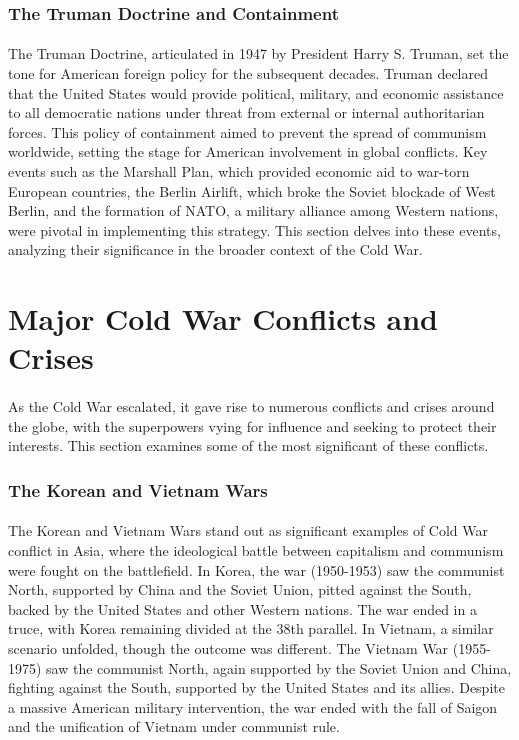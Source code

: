 \documentclass[a4paper,12pt]{book}
\begin{document}
\subsubsection*{The Truman Doctrine and Containment}
\paragraph{}
The Truman Doctrine, articulated in 1947 by President Harry S. Truman, set the tone for American foreign policy for the subsequent decades. Truman declared that the United States would provide political, military, and economic assistance to all democratic nations under threat from external or internal authoritarian forces. This policy of containment aimed to prevent the spread of communism worldwide, setting the stage for American involvement in global conflicts. Key events such as the Marshall Plan, which provided economic aid to war-torn European countries, the Berlin Airlift, which broke the Soviet blockade of West Berlin, and the formation of NATO, a military alliance among Western nations, were pivotal in implementing this strategy. This section delves into these events, analyzing their significance in the broader context of the Cold War.

\section*{Major Cold War Conflicts and Crises}
\paragraph{}
As the Cold War escalated, it gave rise to numerous conflicts and crises around the globe, with the superpowers vying for influence and seeking to protect their interests. This section examines some of the most significant of these conflicts.

\subsubsection*{The Korean and Vietnam Wars}
\paragraph{}
The Korean and Vietnam Wars stand out as significant examples of Cold War conflict in Asia, where the ideological battle between capitalism and communism were fought on the battlefield. In Korea, the war (1950-1953) saw the communist North, supported by China and the Soviet Union, pitted against the South, backed by the United States and other Western nations. The war ended in a truce, with Korea remaining divided at the 38th parallel. In Vietnam, a similar scenario unfolded, though the outcome was different. The Vietnam War (1955-1975) saw the communist North, again supported by the Soviet Union and China, fighting against the South, supported by the United States and its allies. Despite a massive American military intervention, the war ended with the fall of Saigon and the unification of Vietnam under communist rule. 
\end{document}
